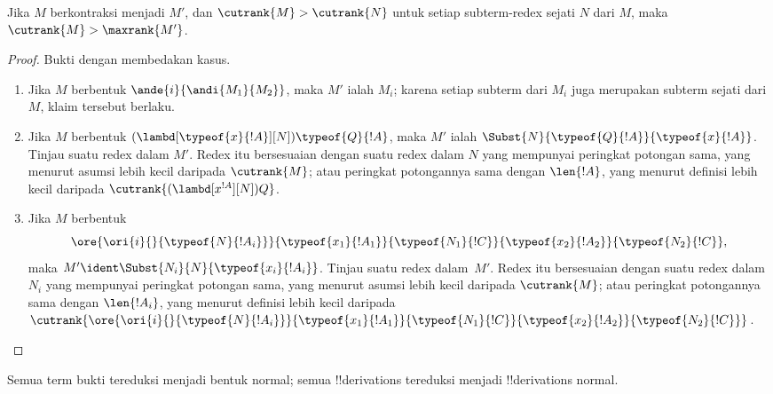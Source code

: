 \documentclass[../../../include/open-logic-section]{subfiles}
\begin{document}
\begin{lem}
  Jika $M$ berkontraksi menjadi $M'$, dan $\cutrank{M} >
  \cutrank{N}$ untuk setiap subterm-redex sejati $N$ dari $M$, maka
  $\cutrank{M} > \maxrank{M'}$.
\end{lem}

\begin{proof}
  Bukti dengan membedakan kasus.
  \begin{enumerate}
  \item Jika $M$ berbentuk $\ande{i}{\andi{M_1}{M_2}}$, maka $M'$ ialah
    $M_i$; karena setiap subterm dari $M_i$ juga merupakan subterm sejati
    dari $M$, klaim tersebut berlaku.
  \item Jika $M$ berbentuk
    $(\lambd[\typeof{x}{!A}][N])\typeof{Q}{!A}$, maka $M'$ ialah
    $\Subst{N}{\typeof{Q}{!A}}{\typeof{x}{!A}}$. Tinjau suatu redex dalam
    $M'$. Redex itu bersesuaian dengan suatu redex dalam $N$ yang
    mempunyai peringkat potongan sama, yang menurut asumsi lebih kecil
    daripada $\cutrank{M}$; atau peringkat potongannya sama dengan
    $\len{!A}$, yang menurut definisi lebih kecil daripada
    $\cutrank{(\lambd[x^{!A}][N])Q}$.
  \item Jika $M$ berbentuk
    \[
    \ore{\ori{i}{}{\typeof{N}{!A_i}}}
        {\typeof{x_1}{!A_1}}{\typeof{N_1}{!C}}
        {\typeof{x_2}{!A_2}}{\typeof{N_2}{!C}},
    \]
    maka $M' \ident \Subst{N_i}{N}{\typeof{x_i}{!A_i}}$. Tinjau suatu
    redex dalam~$M'$. Redex itu bersesuaian dengan suatu redex dalam
    $N_i$ yang mempunyai peringkat potongan sama, yang menurut asumsi
    lebih kecil daripada $\cutrank{M}$; atau peringkat potongannya sama
    dengan $\len{!A_i}$, yang menurut definisi lebih kecil daripada
    $\cutrank{\ore{\ori{i}{}{\typeof{N}{!A_i}}}
      {\typeof{x_1}{!A_1}}{\typeof{N_1}{!C}}
      {\typeof{x_2}{!A_2}}{\typeof{N_2}{!C}}}$.
  \end{enumerate}
\end{proof}

\begin{thm}
  Semua term bukti tereduksi menjadi bentuk normal; semua
  !!{derivation}s tereduksi menjadi !!{derivation}s normal.
\end{thm}
\end{document}
